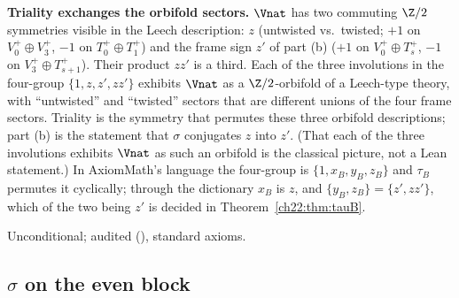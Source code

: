 \begin{physics}
\textbf{Triality exchanges the orbifold sectors.}  $\Vnat$ has two commuting $\Z/2$ symmetries visible in the
Leech description: $z$ (untwisted vs.\ twisted; $+1$ on $V_0^+\oplus V_3^+$, $-1$ on $T_0^+\oplus T_1^+$) and the frame sign
$z'$ of part (b) ($+1$ on $V_0^+\oplus T_s^+$, $-1$ on $V_3^+\oplus T_{s+1}^+$).  Their product $zz'$ is a third.  Each of the three involutions in the four-group
$\{1,z,z',zz'\}$ exhibits $\Vnat$ as a $\Z/2$-orbifold of a Leech-type theory, with ``untwisted'' and ``twisted'' sectors
that are different unions of the four frame sectors.  Triality is the symmetry that permutes these three orbifold
descriptions; part (b) is the statement that $\sigma$ conjugates $z$ into $z'$.  (That each of the three involutions exhibits $\Vnat$
as such an orbifold is the classical picture, not a Lean statement.)  In AxiomMath's language the four-group is
$\{1,x_B,y_B,z_B\}$ and $\tau_B$ permutes it cyclically; through the dictionary $x_B$ is $z$, and $\{y_B,z_B\}=\{z',zz'\}$,
which of the two being $z'$ is decided in Theorem~\ref{ch22:thm:tauB}.
\end{physics}
\begin{status}Unconditional; audited (), standard axioms.\end{status}

\subsection{\texorpdfstring{$\sigma$}{sigma} on the even block}

